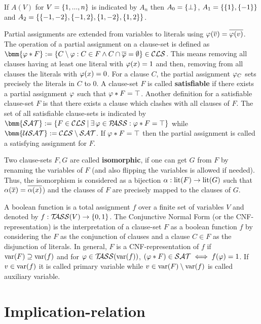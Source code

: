 \documentclass{report}
\begin{document}
\begin{examp}\label{exp:An}
If $A(V)$ for $V=\{ 1,..., n \}$ is indicated by $A_n$ then $A_0 = \{ \bot \}$, $A_1 = \{ \{ 1 \},\{ -1 \} \}$ and $A_2 = \{ \{ -1,-2 \},\{ -1,2 \},\{ 1,-2 \},\{ 1,2 \} \}$.
\end{examp}

Partial assignments are extended from variables to literals using $\varphi(\overline{v})=\overline{\varphi(v)}$. The operation of a partial assignment on a clause-set is defined as $\bmm{\vp * F} := \set{C \sm \vp : C \in F \wedge C \cap \ol{\vp} = \es} \in \Cls$. This means removing all clauses having at least one literal with $\varphi (x)=1$ and then, removing from all clauses the literals with $\varphi (x)=0$. For a clause $C$, the partial assignment $\varphi_C$ sets precisely the literals in $C$ to 0. A clause-set $F$ is called \textbf{satisfiable} if there exists a partial assignment $\varphi$ such that $\varphi * F = \top$. Another definition for a satisfiable clause-set $F$ is that there exists a clause which clashes with all clauses of $F$. The set of all satisfiable clause-sets is indicated by $\bmm{\Sat} := \set{F \in \Cls \mb \ex\, \vp \in \Pass : \vp * F = \top}$ while $\bmm{\Usat} := \Cls \sm \Sat$. If $\varphi * F = \top$ then the partial assignment is called a satisfying assignment for $F$.

Two clause-sets $F, G$ are called \textbf{isomorphic}, if one can get $G$ from $F$ by renaming the variables of $F$ (and also flipping the variables is allowed if needed). Thus, the isomorphism is considered as a bijection $\alpha: \operatorname{lit}(F) \rightarrow \operatorname{lit}(G)$ such that $\alpha(\overline{x}) = \overline{\alpha(x)}$) and the clauses of $F$ are precisely mapped to the clauses of $G$. 

A boolean function is a total assignment $f$ over a finite set of variables $V$ and denoted by $f:  \mathcal{T\hspace{-0.35em}ASS}(V) \rightarrow \{ 0,1 \}$. The Conjunctive Normal Form (or the CNF-representation) is the interpretation of a clause-set $F$ as a boolean function $f$ by considering the $F$ as the conjunction of clauses and a clause $C \in F$ as the disjunction of literals. In general, $F$ is a CNF-representation of $f$ if $\operatorname{var}(F) \supseteq \operatorname{var}(f)$ and for $\varphi \in \mathcal{T\hspace{-0.35em}ASS}(\operatorname{var}(f))$, $(\varphi * F) \in \mathcal{SAT} \iff f(\varphi) = 1$. If $v \in \operatorname{var}(f)$ it is called primary variable while $v \in \operatorname{var}(F) \setminus \operatorname{var}(f)$ is called auxiliary variable.

\section{Implication-relation}
\label{sec:imprel}
\end{document}
